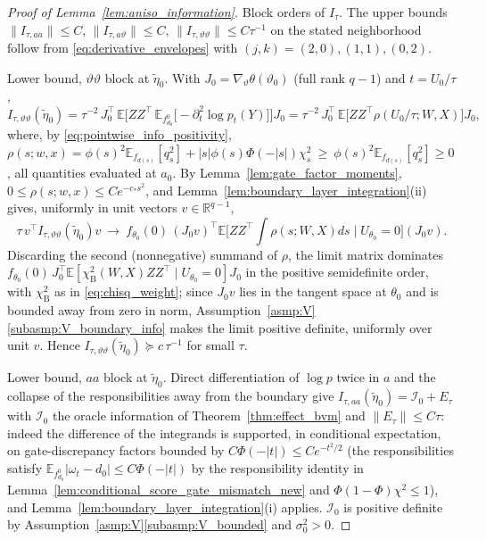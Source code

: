 \documentclass[11pt]{article}
\theoremstyle{definition}
\theoremstyle{plain}
\newcommand{\E}{\mathbb{E}}
\newcommand{\R}{\mathbb{R}}
\begin{document}
\begin{proof}[Proof of Lemma~\ref{lem:aniso_information}]
Block orders of $I_\tau$. The upper bounds
$\|I_{\tau,aa}\|\le C$, $\|I_{\tau,a\vartheta}\|\le C$, $\|I_{\tau,\vartheta\vartheta}\|\le C\tau^{-1}$
on the stated neighborhood follow from \eqref{eq:derivative_envelopes} with $(j,k)=(2,0),(1,1),(0,2)$.

Lower bound, $\vartheta\vartheta$ block at $\tilde\eta_0$. With $J_0=\nabla_\vartheta\theta(\vartheta_0)$ (full rank $q-1$) and $t=U_0/\tau$,
\[
I_{\tau,\vartheta\vartheta}(\tilde\eta_0)
=\tau^{-2}\,J_0^\top\,\E\Big[ZZ^\top\,\E_{f^0_{d_0}}\big[-\partial^2_t\log p_t(Y)\big]\Big]J_0
=\tau^{-2}\,J_0^\top\,\E\big[ZZ^\top\rho(U_0/\tau;W,X)\big]J_0,
\]
where, by \eqref{eq:pointwise_info_positivity},
$\rho(s;w,x)=\phi(s)^2\E_{f_{d(s)}}[q_s^2]+|s|\phi(s)\Phi(-|s|)\chi^2_s\ \ge\ \phi(s)^2\E_{f_{d(s)}}[q_s^2]\ge0$,
all quantities evaluated at $a_0$. By Lemma~\ref{lem:gate_factor_moments}, $0\le\rho(s;w,x)\le Ce^{-c_*s^2}$, and Lemma~\ref{lem:boundary_layer_integration}(ii) gives, uniformly in unit vectors $v\in\R^{q-1}$,
\[
\tau\,v^\top I_{\tau,\vartheta\vartheta}(\tilde\eta_0)v
\ \longrightarrow\
f_{\theta_0}(0)\,(J_0v)^\top\E\Big[ZZ^\top\!\!\int\rho(s;W,X)ds\;\Big|\;U_{\theta_0}=0\Big](J_0v).
\]
Discarding the second (nonnegative) summand of $\rho$, the limit matrix dominates
$f_{\theta_0}(0)\,J_0^\top\E[\chi^2_{\mathrm B}(W,X)ZZ^\top\mid U_{\theta_0}=0]J_0$ in the positive semidefinite order, with $\chi^2_{\mathrm B}$ as in \eqref{eq:chisq_weight}; since $J_0v$ lies in the tangent space at $\theta_0$ and is bounded away from zero in norm, Assumption~\ref{asmp:V}\ref{subasmp:V_boundary_info} makes the limit positive definite, uniformly over unit $v$. Hence $I_{\tau,\vartheta\vartheta}(\tilde\eta_0)\succeq c\,\tau^{-1}$ for small $\tau$.

Lower bound, $aa$ block at $\tilde\eta_0$. Direct differentiation of $\log p$ twice in $a$ and the collapse of the responsibilities away from the boundary give
$I_{\tau,aa}(\tilde\eta_0)=\mathcal I_0+E_\tau$ with $\mathcal I_0$ the oracle information of Theorem~\ref{thm:effect_bvm} and $\|E_\tau\|\le C\tau$: indeed the difference of the integrands is supported, in conditional expectation, on gate-discrepancy factors bounded by $C\Phi(-|t|)\le Ce^{-t^2/2}$ (the responsibilities satisfy $\E_{f^0_{d_0}}|\omega_t-d_0|\le C\Phi(-|t|)$ by the responsibility identity in Lemma~\ref{lem:conditional_score_gate_mismatch_new} and $\Phi(1-\Phi)\chi^2\le1$), and Lemma~\ref{lem:boundary_layer_integration}(i) applies. $\mathcal I_0$ is positive definite by Assumption~\ref{asmp:V}\ref{subasmp:V_bounded} and $\sigma_0^2>0$.


\end{proof}
\end{document}
